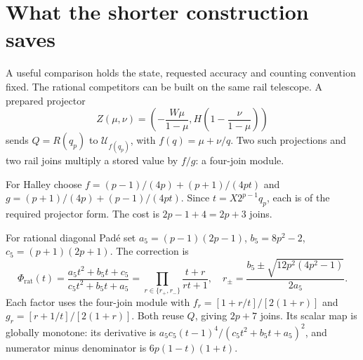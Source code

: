 \documentclass[11pt,a4paper]{article}
\newcommand{\hub}[1]{\mathcal U_{#1}}
\begin{document}
\clearpage
\section{What the shorter construction saves}\label{sec:cost}
A useful comparison holds the state, requested accuracy and counting convention fixed. The rational competitors can be built on the same rail telescope. A prepared projector
\[
 Z(\mu,\nu)=\left(-\frac{W\mu}{1-\mu},H\left(1-\frac{\nu}{1-\mu}\right)\right)
\]
sends $Q=R(q_p)$ to $\hub{f(q_p)}$, with $f(q)=\mu+\nu/q$. Two such projections and two rail joins multiply a stored value by $f/g$: a four-join module.

For Halley choose $f=(p-1)/(4p)+(p+1)/(4pt)$ and $g=(p+1)/(4p)+(p-1)/(4pt)$. Since $t=X2^{p-1}q_p$, each is of the required projector form. The cost is $2p-1+4=2p+3$ joins.

For rational diagonal Pad\'e set $a_5=(p-1)(2p-1)$, $b_5=8p^2-2$, $c_5=(p+1)(2p+1)$. The correction is
\[
 \Phi_{\mathrm{rat}}(t)=\frac{a_5t^2+b_5t+c_5}{c_5t^2+b_5t+a_5}
 =\prod_{r\in\{r_+,r_-\}}\frac{t+r}{rt+1},\quad
 r_\pm=\frac{b_5\pm\sqrt{12p^2(4p^2-1)}}{2a_5}.
\]
Each factor uses the four-join module with $f_r=[1+r/t]/[2(1+r)]$ and $g_r=[r+1/t]/[2(1+r)]$. Both reuse $Q$, giving $2p+7$ joins. Its scalar map is globally monotone: its derivative is $a_5c_5(t-1)^4/(c_5t^2+b_5t+a_5)^2$, and numerator minus denominator is $6p(1-t)(1+t)$.
\end{document}
